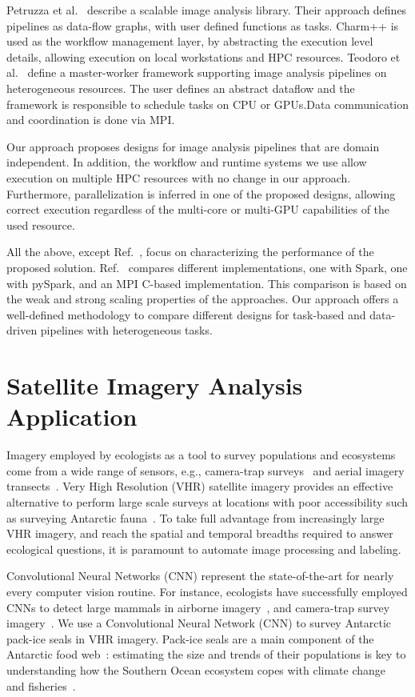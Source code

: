 Petruzza et al.~\cite{petruzza2017isavs} describe a scalable image analysis 
library. Their approach defines pipelines as data-flow graphs, with user 
defined functions as tasks. Charm++ is used as the workflow management layer, 
by abstracting the execution level details, allowing execution on local 
workstations and HPC resources. Teodoro et 
al.~\cite{teodoro2013highthroughput} define a master-worker framework 
supporting image analysis pipelines on heterogeneous resources. The user 
defines an abstract dataflow and the framework is responsible to schedule 
tasks on CPU or GPUs.Data communication and coordination is done via MPI.
 
Our approach proposes designs for image analysis pipelines that are domain 
independent. In addition, the workflow and runtime systems we use allow  
execution on multiple HPC resources with no change in our approach. 
Furthermore, parallelization is inferred in one of the proposed designs,  
allowing correct execution regardless of the multi-core or multi-GPU  
capabilities of the used resource.
 
All the above, except Ref.~\cite{zhang2016kira}, focus on characterizing the 
performance of the proposed solution. Ref.~\cite{zhang2016kira} compares 
different implementations, one with Spark, one with pySpark, and an MPI 
C-based implementation. This comparison is based on the weak and strong 
scaling properties of the approaches. Our approach offers a well-defined 
methodology to compare different designs for task-based and data-driven 
pipelines with heterogeneous tasks.
 

\section{Satellite Imagery Analysis Application}
\label{sec:ucase}
Imagery employed by ecologists as a tool to survey populations and ecosystems 
come from a wide range of sensors, e.g., camera-trap 
surveys~\cite{karanth1995estimating} and aerial imagery 
transects~\cite{western2009impact}. Very High Resolution (VHR) satellite 
imagery provides an effective alternative to perform large scale surveys at 
locations with poor accessibility such as surveying Antarctic 
fauna~\cite{lynch2012detection}. To take full advantage from increasingly 
large VHR imagery, and reach the spatial and temporal breadths required to 
answer ecological questions, it is paramount to automate image processing and 
labeling.

Convolutional Neural Networks (CNN) represent the state-of-the-art for nearly 
every computer vision routine. For instance, ecologists have successfully 
employed CNNs to detect large mammals in airborne 
imagery~\cite{kellenberger2018detecting,polzounov2016right}, and camera-trap 
survey imagery~\cite{norouzzadeh2018automatically}. We use a Convolutional 
Neural Network (CNN) to survey Antarctic pack-ice seals in VHR imagery. 
Pack-ice seals are a main component of the Antarctic food 
web~\cite{fabra2008convention}: estimating the size and trends of their 
populations is key to understanding how the Southern Ocean ecosystem copes 
with climate change~\cite{hillebrand2018climate} and 
fisheries~\cite{reid2019climate}.

